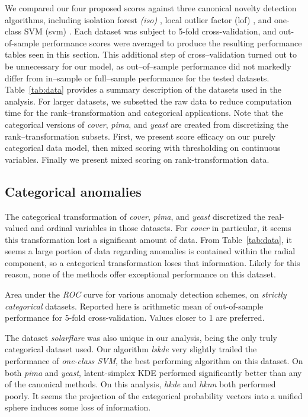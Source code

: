 We compared our four proposed scores against three canonical novelty detection 
    algorithms, including isolation forest \emph{(iso)} \cite{liu2000}, local 
    outlier factor (lof) \cite{breunig2000}, and one-class SVM (svm) 
    \cite{chang2011}.  Each dataset was subject to 5-fold cross-validation, and 
    out-of-sample performance scores were averaged to produce the resulting 
    performance tables seen in this section.  This additional step of 
    cross--validation turned out to be unnecessary for our model, as 
    out--of--sample performance did not markedly differ from in--sample or 
    full--sample performance for the tested datasets.  Table~\ref{tab:data}
    provides a summary description of the datasets used in the analysis.
    For larger datasets, we subsetted the raw data to reduce computation time
    for the rank--transformation and categorical applications.
    Note that the categorical versions of \emph{cover}, \emph{pima}, and 
    \emph{yeast} are created from discretizing the rank--transformation subsets.
    First, we present score efficacy on our purely categorical data model, then 
    mixed scoring with thresholding on continuous variables.  Finally we present 
    mixed scoring on rank-transformation data.

\subsection{Categorical anomalies}
The categorical transformation of \emph{cover}, \emph{pima}, and \emph{yeast}
    discretized the real-valued and ordinal variables in those datasets.  For 
    \emph{cover} in particular, it seems this transformation lost a significant 
    amount of data.  From Table~\ref{tab:data}, it seems a large portion of 
    data regarding anomalies is contained within the radial component, so a 
    categorical transformation loses that information.  Likely for this reason, 
    none of the methods offer exceptional performance on this dataset.
\begin{table}[ht]
    \centering
    \small
    \caption{Area under the \emph{ROC} curve for various anomaly detection 
        schemes, on \emph{strictly categorical} datasets.  Reported here is 
        arithmetic mean of out-of-sample performance for 5-fold cross-validation.  
        Values closer to 1 are preferred.\label{tab:perfcat}}
    \bigskip
    
\end{table}
The dataset \emph{solarflare} was also unique in our analysis, being the only 
    truly categorical dataset used.  Our algorithm \emph{lskde} very slightly 
    trailed the performance of \emph{one-class SVM}, the best performing 
    algorithm on this dataset.  On both \emph{pima} and \emph{yeast}, 
    latent-simplex KDE performed significantly better than any of the canonical 
    methods.  On this analysis, \emph{hkde} and \emph{hknn} both performed 
    poorly.  It seems the projection of the categorical probability vectors into 
    a unified sphere induces some loss of information.


